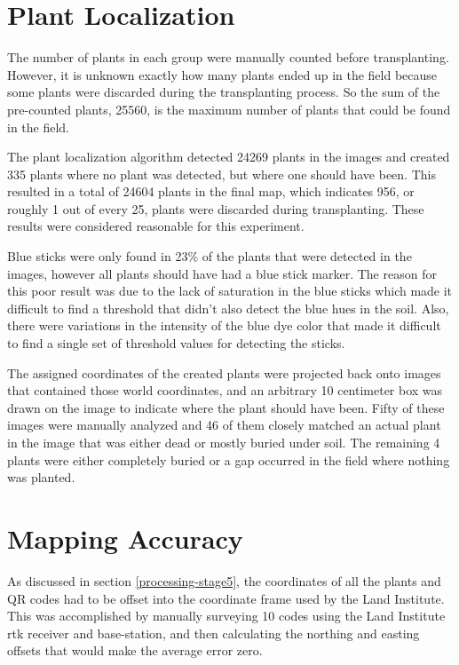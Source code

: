 \section{Plant Localization}
\label{section:plant_localization}

The number of plants in each group were manually counted before transplanting. However, it is unknown exactly how many plants ended up in the field because some plants were discarded during the transplanting process.  So the sum of the pre-counted plants, 25560, is the maximum number of plants that could be found in the field.  

The plant localization algorithm detected 24269 plants in the images and created 335 plants where no plant was detected, but where one should have been.  This resulted in a total of 24604 plants in the final map, which indicates 956, or roughly 1 out of every 25, plants were discarded during transplanting.  These results were considered reasonable for this experiment. 

Blue sticks were only found in 23\% of the plants that were detected in the images, however all plants should have had a blue stick marker.  The reason for this poor result was due to the lack of saturation in the blue sticks which made it difficult to find a threshold that didn't also detect the blue hues in the soil.  Also, there were variations in the intensity of the blue dye color that made it difficult to find a single set of threshold values for detecting the sticks.   

The assigned coordinates of the created plants were projected back onto images that contained those world coordinates, and an arbitrary 10 centimeter box was drawn on the image to indicate where the plant should have been.  Fifty of these images were manually analyzed and 46 of them closely matched an actual plant in the image that was either dead or mostly buried under soil.  The remaining 4 plants were either completely buried or a gap occurred in the field where nothing was planted.  

\section{Mapping Accuracy}

As discussed in section \ref{processing-stage5}, the coordinates of all the plants and QR codes had to be offset into the coordinate frame used by the Land Institute.  This was accomplished by manually surveying 10 codes using the Land Institute \ac{rtk} receiver and base-station, and then calculating the northing and easting offsets that would make the average error zero.  

